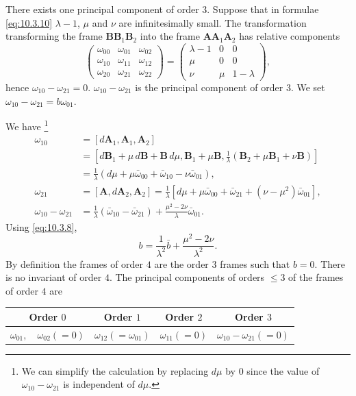 There exists one principal component of order $3$. Suppose that in formulae \eqref{eq:10.3.10} $\lambda-1$, $\mu$ and $\nu$ are infinitesimally small. The transformation transforming the frame $\mathbf{BB}_{1}\mathbf{B}_{2}$ into the frame $\mathbf{AA}_{1}\mathbf{A}_{2}$ has relative components
\[
\begin{pmatrix}
  \omega_{00}&\omega_{01}&\omega_{02}\\
  \omega_{10}&\omega_{11}&\omega_{12}\\
  \omega_{20}&\omega_{21}&\omega_{22}
\end{pmatrix}=
\begin{pmatrix}
  \lambda-1&0&0\\
  \mu&0&0\\
  \nu&\mu&1-\lambda
\end{pmatrix},
\]
hence $\omega_{10}-\omega_{21}=0$. $\omega_{10}-\omega_{21}$ is the principal component of order $3$. We set $\omega_{10}-\omega_{21}=b\omega_{01}$.

We have \footnote{We can simplify the calculation by replacing $d\mu$ by $0$ since the value of $\omega_{10}-\omega_{21}$ is independent of $d\mu$.}
\begin{align*}
  \omega_{10}&=[d\mathbf{A}_{1},\mathbf{A}_{1},\mathbf{A}_{2}]\\
  &=\left[d\mathbf{B}_{1}+\mu\,d\mathbf{B}+\mathbf{B}\,d\mu,
    \mathbf{B}_{1}+\mu\mathbf{B},
    \frac{1}{\lambda}(\mathbf{B}_{2}+\mu\mathbf{B}_{1}+\nu\mathbf{B})\right]\\
  &=\frac{1}{\lambda}(d\mu+\mu\bar\omega_{00}+\bar\omega_{10}-\nu\bar\omega_{01}),\\
  \omega_{21}&=[\mathbf{A},d\mathbf{A}_{2},\mathbf{A}_{2}]=\frac{1}{\lambda}
  [d\mu+\mu\bar\omega_{00}+\bar\omega_{21}+(\nu-\mu^{2})\bar\omega_{01}],\\
  \omega_{10}-\omega_{21}&=\frac{1}{\lambda}(\bar\omega_{10}-\bar\omega_{21})+\frac{\mu^{2}-2\nu}{\lambda}\bar\omega_{01}.
\end{align*}
Using \eqref{eq:10.3.8},
\begin{equation}
  \label{eq:10.3.11}
  b=\frac{1}{\lambda^{2}}\bar b+\frac{\mu^{2}-2\nu}{\lambda^{2}}.
\end{equation}
By definition the frames of order $4$ are the order $3$ frames such that $b=0$. There is no invariant of order $4$. The principal components of orders $\le 3$ of the frames of order $4$ are
\begin{center}  
  \begin{tabular}{|c|c|c|c|}
    \hline
    Order $0$&Order $1$&Order $2$&Order $3$\\
    \hline
    $\omega_{01},\quad\omega_{02}(=0)$&$\omega_{12}(=\omega_{01})$&$\omega_{11}(=0)$&$\omega_{10}-\omega_{21}(=0)$\\
    \hline
  \end{tabular}
\end{center}


